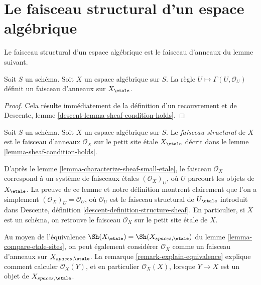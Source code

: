 \section{Le faisceau structural d'un espace algébrique}
\label{section-structure-sheaf}

\noindent
Le faisceau structural d'un espace algébrique est le faisceau d'anneaux
du lemme suivant.

\begin{lemma}
\label{lemma-sheaf-condition-holds}
Soit $S$ un schéma. Soit $X$ un espace algébrique sur $S$.
La règle $U \mapsto \Gamma(U, \mathcal{O}_U)$ définit
un faisceau d'anneaux sur $X_\etale$.
\end{lemma}

\begin{proof}
Cela résulte immédiatement de la définition d'un recouvrement et de
Descente, lemme \ref{descent-lemma-sheaf-condition-holds}.
\end{proof}

\begin{definition}
\label{definition-structure-sheaf}
Soit $S$ un schéma.
Soit $X$ un espace algébrique sur $S$.
Le {\it faisceau structural} de $X$
est le faisceau d'anneaux $\mathcal{O}_X$
sur le petit site \'etale $X_\etale$ décrit dans le
lemme \ref{lemma-sheaf-condition-holds}.
\end{definition}

\noindent
D'après le lemme \ref{lemma-characterize-sheaf-small-etale}, le faisceau
$\mathcal{O}_X$ correspond à un système de faisceaux \'etales $(\mathcal{O}_X)_U$,
où $U$ parcourt les objets de $X_\etale$. La preuve de ce lemme et
notre définition montrent clairement que l'on a simplement
$(\mathcal{O}_X)_U = \mathcal{O}_U$, où $\mathcal{O}_U$ est le faisceau
structural de $U_\etale$ introduit dans
Descente, définition \ref{descent-definition-structure-sheaf}.
En particulier, si $X$ est un schéma, on retrouve le faisceau $\mathcal{O}_X$
sur le petit site \'etale de $X$.

\medskip\noindent
Au moyen de l'équivalence
$\Sh(X_\etale) = \Sh(X_{spaces, \etale})$
du lemme \ref{lemma-compare-etale-sites}, on peut également considérer $\mathcal{O}_X$
comme un faisceau d'anneaux sur $X_{spaces, \etale}$. La
remarque \ref{remark-explain-equivalence}
explique comment calculer $\mathcal{O}_X(Y)$, et en particulier $\mathcal{O}_X(X)$, lorsque
$Y \to X$ est un objet de $X_{spaces, \etale}$.


